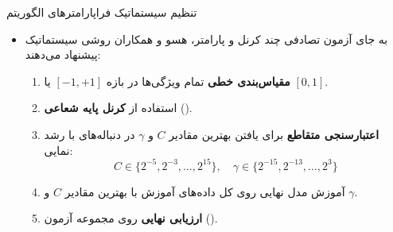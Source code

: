 \begin{frame}{تنظیم سیستماتیک فراپارامترهای الگوریتم }{}
  \begin{itemize}
    \setlength{\itemsep}{5pt}
    \item به جای آزمون تصادفی چند کرنل و پارامتر، هسو و همکاران روشی سیستماتیک پیشنهاد می‌دهند:
    \begin{enumerate}
      \setlength{\itemsep}{3pt}
      \item \textbf{مقیاس‌بندی خطی} تمام ویژگی‌ها در بازه $[-1, +1]$ یا $[0, 1]$.
      \item استفاده از \textbf{کرنل پایه شعاعی} ().
      \item \textbf{اعتبارسنجی متقاطع} برای یافتن بهترین مقادیر $C$ و $\gamma$ در دنباله‌های با رشد نمایی:
      \[
        C \in \{2^{-5}, 2^{-3}, \dots, 2^{15}\}, \quad \gamma \in \{2^{-15}, 2^{-13}, \dots, 2^3\}
      \]
      \item آموزش مدل نهایی روی کل داده‌های آموزش با بهترین مقادیر $C$ و $\gamma$.
      \item \textbf{ارزیابی نهایی} روی مجموعه آزمون ().
    \end{enumerate}
  \end{itemize}
  \vfill
  {\fontsize{7}{8.5}\selectfont\color{subgray}
  }
\end{frame}
